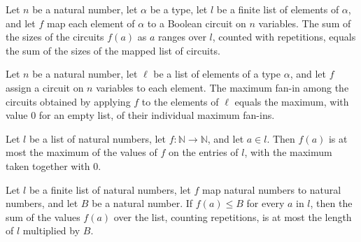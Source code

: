 \begin{theorem}
\label{BoolCircuit.sumSize_map}
\leanok
{}
Let $n$ be a natural number, let $\alpha$ be a type, let $l$ be a finite list of
elements of $\alpha$, and let $f$ map each element of $\alpha$ to a Boolean circuit on
$n$ variables. The sum of the sizes of the circuits $f(a)$ as $a$ ranges over $l$,
counted with repetitions, equals the sum of the sizes of the mapped list of circuits.
\end{theorem}

\begin{theorem}
\label{BoolCircuit.maxFaninL_map}
\leanok
{}
Let $n$ be a natural number, let $\ell$ be a list of elements of a type $\alpha$, and
let $f$ assign a circuit on $n$ variables to each element. The maximum fan-in among the
circuits obtained by applying $f$ to the elements of $\ell$ equals the maximum, with
value $0$ for an empty list, of their individual maximum fan-ins.
\end{theorem}

\begin{theorem}
\label{BoolCircuit.le_foldr_max}
\leanok
{}
Let $l$ be a list of natural numbers, let $f:\mathbb{N}\to\mathbb{N}$, and let $a\in l$.
Then $f(a)$ is at most the maximum of the values of $f$ on the entries of $l$, with the
maximum taken together with $0$.
\end{theorem}

\begin{theorem}
\label{BoolCircuit.sum_le_card_mul}
\leanok
{}
Let $l$ be a finite list of natural numbers, let $f$ map natural numbers to natural
numbers, and let $B$ be a natural number. If $f(a)\le B$ for every $a$ in $l$, then the
sum of the values $f(a)$ over the list, counting repetitions, is at most the length of
$l$ multiplied by $B$.
\end{theorem}

